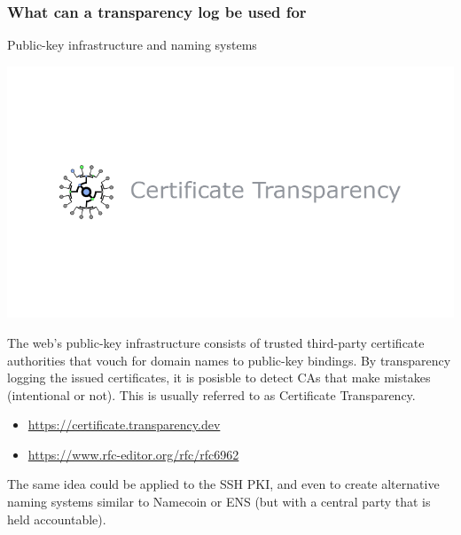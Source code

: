 \begin{frame}
  \frametitle{What can a transparency log be used for}

  \centerline{Public-key infrastructure and naming systems}

  \centerline{\includegraphics[scale=.15]{img/ct}}
  \pause

  The web's public-key infrastructure consists of trusted third-party
  certificate authorities that vouch for domain names to public-key
  bindings. By transparency logging the issued certificates, it is
  posisble to detect CAs that make mistakes (intentional or not).
  This is usually referred to as Certificate Transparency.

  \begin{itemize}
  \item \url{https://certificate.transparency.dev}
  \item \url{https://www.rfc-editor.org/rfc/rfc6962}
  \end{itemize}

  \pause

  The same idea could be applied to the SSH PKI, and even to create
  alternative naming systems similar to Namecoin or ENS (but with a
  central party that is held accountable).
\end{frame}

